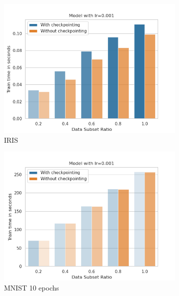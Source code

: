 \newpage
\begin{figure}[h]
    \centering
    \begin{subfigure}[b]{0.24\textwidth}
        \centering
        \includegraphics[width=\textwidth]{figures/22_07/iris/train_subset_0.001.png}
        \caption{IRIS}
        \label{fig:10a}
    \end{subfigure}
    \begin{subfigure}[b]{0.24\textwidth}
        \centering
        \includegraphics[width=\textwidth]{figures/22_07/10ep/train_subset_0.001.png}
        \caption{MNIST 10 epochs}
        \label{fig:10b}
    \end{subfigure}
    \begin{subfigure}[b]{0.24\textwidth}

\end{subfigure}
\end{figure}
